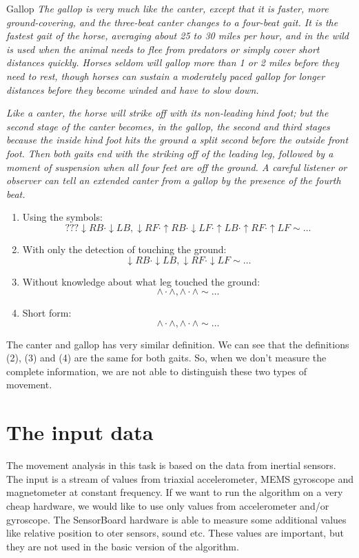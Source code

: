 \begin{definition}{Gallop}
	\label{def:gallop}
	\textit{The gallop is very much like the canter, except that it is faster, more ground-covering, and the three-beat canter changes to a four-beat gait. It is the fastest gait of the horse, averaging about 25 to 30 miles per hour, and in the wild is used when the animal needs to flee from predators or simply cover short distances quickly. Horses seldom will gallop more than 1 or 2 miles before they need to rest, though horses can sustain a moderately paced gallop for longer distances before they become winded and have to slow down.}
	
	\textit{Like a canter, the horse will strike off with its non-leading hind foot; but the second stage of the canter becomes, in the gallop, the second and third stages because the inside hind foot hits the ground a split second before the outside front foot. Then both gaits end with the striking off of the leading leg, followed by a moment of suspension when all four feet are off the ground. A careful listener or observer can tell an extended canter from a gallop by the presence of the fourth beat.} \cite{Harrisc1993}
	
	\begin{enumerate}
		\item Using the symbols:
		$$ ??? \downarrow RB \cdot \downarrow LB, \downarrow RF \cdot \uparrow RB \cdot \downarrow LF \cdot \uparrow LB \cdot \uparrow RF \cdot \uparrow LF \sim \dots $$
		\item With only the detection of touching the ground:
		$$ \downarrow RB \cdot \downarrow LB, \downarrow RF \cdot \downarrow LF \sim \dots $$
		\item Without knowledge about what leg touched the ground:
		$$ \wedge \cdot \wedge, \wedge \cdot \wedge \sim \dots $$
		\item Short form:
		$$ \wedge \cdot \wedge, \wedge \cdot \wedge \sim \dots $$
	\end{enumerate}
\end{definition}

\begin{remark}
	The canter and gallop has very similar definition. We can see that the definitions (2), (3) and (4) are the same for both gaits. So, when we don't measure the complete information, we are not able to distinguish these two types of movement.
\end{remark}

\section{The input data}
The movement analysis in this task is based on the data from inertial sensors. The input is a stream of values from triaxial accelerometer, \ac{MEMS} gyroscope and magnetometer at constant frequency. If we want to run the algorithm on a very cheap hardware, we would like to use only values from accelerometer and/or gyroscope. The SensorBoard hardware is able to measure some additional values like relative position to oter sensors, sound etc. These values are important, but they are not used in the basic version of the algorithm.

